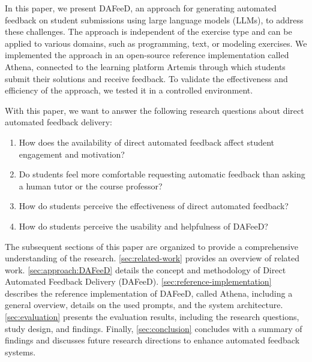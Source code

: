 \documentclass[manuscript,screen,review]{acmart}
\begin{document}
In this paper, we present DAFeeD, an approach for generating automated feedback on student submissions using large language models (LLMs), to address these challenges.
The approach is independent of the exercise type and can be applied to various domains, such as programming, text, or modeling exercises.
We implemented the approach in an open-source reference implementation called Athena, connected to the learning platform Artemis \cite{krusche:2018:ArTEMiSAutomaticAssessmentf} through which students submit their solutions and receive feedback.
To validate the effectiveness and efficiency of the approach, we tested it in a controlled environment. 

With this paper, we want to answer the following research questions about direct automated feedback delivery:

\begin{enumerate}[label=\textbf{RQ\arabic*},ref=RQ\arabic*]
  \item \label{RQ1} How does the availability of direct automated feedback affect student engagement and motivation? 
  \item \label{RQ2} Do students feel more comfortable requesting automatic feedback than asking a human tutor or the course professor?
  \item \label{RQ3} How do students perceive the effectiveness of direct automated feedback?
  \item \label{RQ4} How do students perceive the usability and helpfulness of DAFeeD?
\end{enumerate}


The subsequent sections of this paper are organized to provide a comprehensive understanding of the research. 
\cref{sec:related-work} provides an overview of related work. 
\cref{sec:approach:DAFeeD} details the concept and methodology of Direct Automated Feedback Delivery (DAFeeD).
\cref{sec:reference-implementation} describes the reference implementation of DAFeeD, called Athena, including a general overview, details on the used prompts, and the system architecture. 
\cref{sec:evaluation} presents the evaluation results, including the research questions, study design, and findings. 
Finally, \cref{sec:conclusion} concludes with a summary of findings and discusses future research directions to enhance automated feedback systems.
\end{document}
